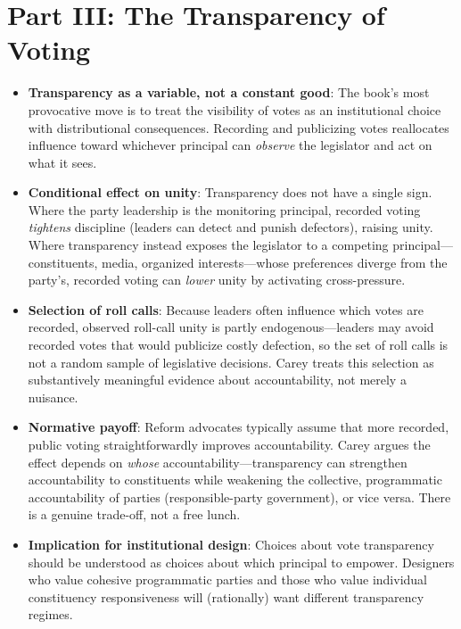 \documentclass[12pt]{article}
\begin{document}
\section{Part III: The Transparency of Voting}

\begin{itemize}[leftmargin=*, itemsep=4pt]
    \item \textbf{Transparency as a variable, not a constant good}: The book's most provocative move is to treat the visibility of votes as an institutional choice with distributional consequences. Recording and publicizing votes reallocates influence toward whichever principal can \emph{observe} the legislator and act on what it sees.
    \item \textbf{Conditional effect on unity}: Transparency does not have a single sign. Where the party leadership is the monitoring principal, recorded voting \emph{tightens} discipline (leaders can detect and punish defectors), raising unity. Where transparency instead exposes the legislator to a competing principal---constituents, media, organized interests---whose preferences diverge from the party's, recorded voting can \emph{lower} unity by activating cross-pressure.
    \item \textbf{Selection of roll calls}: Because leaders often influence which votes are recorded, observed roll-call unity is partly endogenous---leaders may avoid recorded votes that would publicize costly defection, so the set of roll calls is not a random sample of legislative decisions. Carey treats this selection as substantively meaningful evidence about accountability, not merely a nuisance.
    \item \textbf{Normative payoff}: Reform advocates typically assume that more recorded, public voting straightforwardly improves accountability. Carey argues the effect depends on \emph{whose} accountability---transparency can strengthen accountability to constituents while weakening the collective, programmatic accountability of parties (responsible-party government), or vice versa. There is a genuine trade-off, not a free lunch.
    \item \textbf{Implication for institutional design}: Choices about vote transparency should be understood as choices about which principal to empower. Designers who value cohesive programmatic parties and those who value individual constituency responsiveness will (rationally) want different transparency regimes.
\end{itemize}
\end{document}
